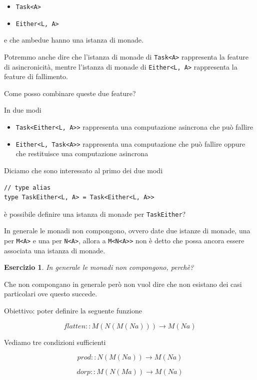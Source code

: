 \documentclass[12pt]{article}
\newtheorem{exercise}{Esercizio}[section]
\begin{document}
\begin{itemize}
\item \texttt{Task<A>}
\item \texttt{Either<L, A>}
\end{itemize}

e che ambedue hanno una istanza di monade.

Potremmo anche dire che l'istanza di monade di \texttt{Task<A>} rappresenta la feature di asincronicità, mentre l'istanza
di monade di \texttt{Either<L, A>} rappresenta la feature di fallimento.

Come posso combinare queste due feature?

In due modi

\begin{itemize}
\item \texttt{Task<Either<L, A>>} rappresenta una computazione asincrona che può fallire
\item \texttt{Either<L, Task<A>>} rappresenta una computazione che può fallire oppure che restituisce una computazione asincrona
\end{itemize}

Diciamo che sono interessato al primo dei due modi

\begin{verbatim}
// type alias
type TaskEither<L, A> = Task<Either<L, A>>
\end{verbatim}

è possibile definire una istanza di monade per \texttt{TaskEither}?

In generale le monadi non compongono, ovvero date due istanze di monade, una per \texttt{M<A>} e una per \texttt{N<A>},
allora a \texttt{M<N<A>>} non è detto che possa ancora essere associata una istanza di monade.

\begin{exercise}
In generale le monadi non compongono, perchè?
\end{exercise}

Che non compongano in generale però non vuol dire che non esistano dei casi particolari ove questo succede.

Obiettivo: poter definire la seguente funzione

$$
flatten :: M ( N ( M ( N a ) ) ) \rightarrow M ( N a )
$$

Vediamo tre condizioni sufficienti

$$
prod :: N (M ( N a ) ) \rightarrow M( N a )
$$

$$
dorp :: M (N ( M a ) ) \rightarrow M ( N a )
$$
\end{document}
